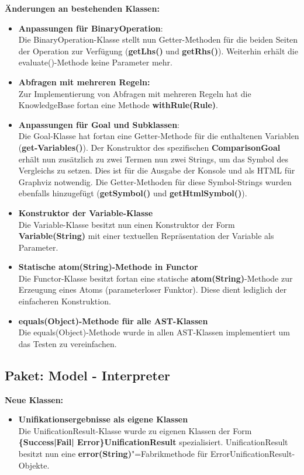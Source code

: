 \documentclass[parskip=full,11pt,twoside]{scrartcl}
\begin{document}
\textbf{Änderungen an bestehenden Klassen:}\\
\begin{itemize}
	\item \textbf{Anpassungen für BinaryOperation}:\\
	Die BinaryOperation-Klasse stellt nun Getter-Methoden für die beiden Seiten der Operation zur Verfügung (\textbf{getLhs()} und \textbf{getRhs()}). Weiterhin erhält die evaluate()-Methode keine Parameter mehr.
	\item \textbf{Abfragen mit mehreren Regeln:}\\
	Zur Implementierung von Abfragen mit mehreren Regeln hat die KnowledgeBase fortan eine Methode \textbf{withRule(Rule)}.
	\item \textbf{Anpassungen für Goal und Subklassen}:\\
	Die Goal-Klasse hat fortan eine Getter-Methode für die enthaltenen Variablen (\textbf{get-Variables()}). Der Konstruktor des spezifischen \textbf{ComparisonGoal} erhält nun zusätzlich zu zwei Termen nun zwei Strings, um das Symbol des Vergleichs zu setzen. Dies ist für die Ausgabe der Konsole und als HTML für Graphviz notwendig. Die Getter-Methoden für diese Symbol-Strings wurden ebenfalls hinzugefügt (\textbf{getSymbol()} und \textbf{getHtmlSymbol()}).
	\item \textbf{Konstruktor der Variable-Klasse}\\
	Die Variable-Klasse besitzt nun einen Konstruktor der Form \textbf{Variable(String)} mit einer textuellen Repräsentation der Variable als Parameter.
	\item \textbf{Statische atom(String)-Methode in Functor}\\
	Die Functor-Klasse besitzt fortan eine statische \textbf{atom(String)}-Methode zur Erzeugung eines Atoms (parameterloser Funktor). Diese dient lediglich der einfacheren Konstruktion.
	\item \textbf{equals(Object)-Methode für alle AST-Klassen}\\
	Die equals(Object)-Methode wurde in allen AST-Klassen implementiert um das Testen zu vereinfachen.
\end{itemize}

\subsection{Paket: Model - Interpreter}

\textbf{Neue Klassen:}\\
\begin{itemize}
	\item \textbf{Unifikationsergebnisse als eigene Klassen}\\
	Die UnificationResult-Klasse wurde zu eigenen Klassen der Form \textbf{\{Success|Fail| Error\}UnificationResult} spezialisiert. UnificationResult besitzt nun eine \textbf{error(String)}"=Fabrikmethode für ErrorUnificationResult-Objekte.
\end{itemize}
\end{document}
